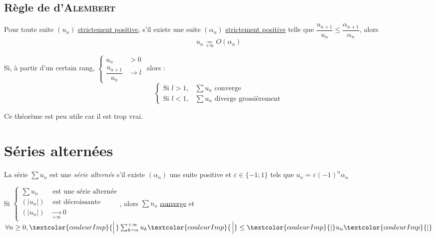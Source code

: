 \documentclass[11pt,a4paper,fleqn,pdftex]{report}
\begin{document}
\subsection{Règle de d'\textsc{Alembert}} %
\label{sub:regle_de_d_alembert}
\begin{lemme}
    Pour toute suite $(u_n)$ \uline{strictement positive}, s'il existe une suite $(\alpha_n)$ \uline{strictement positive} telle que $\dfrac{u_{n+1}}{u_n}\le \dfrac{\alpha_{n+1}}{\alpha_n}$, alors 
    \begin{equation}
    u_n \underset{+\infty}{=} O(\alpha_n)
    \end{equation}
\end{lemme}
\begin{itheorem}\label{th:Regle_de_dAlembert}
    Si, à partir d'un certain rang, $\left\lbrace
    \begin{aligned}
        u_n &> 0    \\
        \dfrac{u_{n+1}}{u_n} &\to l
    \end{aligned}
    \right. $ alors :
    \begin{equation}
    \left\lbrace
    \begin{aligned}
        \text{Si } l >1, & \sum u_n \text{ converge}   \\
        \text{Si } l <1, & \sum u_n \text{ diverge grossièrement} 
    \end{aligned}
    \right.
    \end{equation}
\end{itheorem}


Ce théorème est peu utile car il est \og{}trop vrai\fg{}.
\section{Séries alternées} %
\label{sec:series_alternees}
\begin{dfn}
    La série $\sum u_n$ est une \emph{série alternée} s'il existe $(\alpha_n)$ une suite positive et $\varepsilon \in \lbrace -1 ; 1 \rbrace$ tels que $u_n = \varepsilon (-1)^n\alpha_n$
\end{dfn}
\begin{itheorem}
    Si $\left\lbrace \begin{aligned} \sum u_n &\text{ est une série alternée}\\ (|u_n|) &\text{ est décroissante} \\ (|u_n|) &\xrightarrow[+\infty]{} 0 \end{aligned}\right.$, alors $\sum u_n$ \uline{converge} et $\forall n \ge 0, \textcolor{couleurImp}{\left| \vphantom{\sum_{k=n}^{+\infty}} \right. } \sum_{k=n}^{+\infty}u_k \textcolor{couleurImp}{\left. \vphantom{\sum_{k=n}^{+\infty}} \right| } \le \textcolor{couleurImp}{|} u_n\textcolor{couleurImp}{|}$
\end{itheorem}
\end{document}
